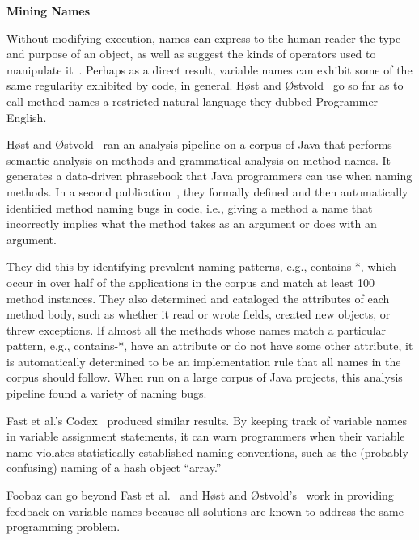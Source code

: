 {\bf Mining Names}

Without modifying execution, names can express to the human reader the type and purpose of an object, as well as suggest the kinds of operators used to manipulate it~\cite{jones2008operand}. Perhaps as a direct result, variable names can exhibit some of the same regularity exhibited by code, in general. H{{\o{}}}st and {{\O{}}}stvold~\cite{host2008java} go so far as to call method names a restricted natural language they dubbed Programmer English.

H{{\o{}}}st and {{\O{}}}stvold~\cite{host2008java} ran an analysis pipeline on a corpus of Java that performs semantic analysis on methods and grammatical analysis on method names. It generates a data-driven phrasebook that Java programmers can use when naming methods. In a second publication~\cite{host2009debugging}, they formally defined and then automatically identified method naming bugs in code, i.e., giving a method a name that incorrectly implies what the method takes as an argument or does with an argument.

They did this by identifying prevalent naming patterns, e.g., contains-*, which occur in over half of the applications in the corpus and match at least 100 method instances. They also determined and cataloged the attributes of each method body, such as whether it read or wrote fields, created new objects, or threw exceptions. If almost all the methods whose names match a particular pattern, e.g., contains-*, have an attribute or do not have some other attribute, it is automatically determined to be an implementation rule that all names in the corpus should follow. When run on a large corpus of Java projects, this analysis pipeline found a variety of naming bugs.

Fast et al.'s Codex~\cite{codex} produced similar results. By keeping track of variable names in variable assignment statements, it can warn programmers when their variable name violates statistically established naming conventions, such as the (probably confusing) naming of a hash object ``array.'' 

Foobaz can go beyond Fast et al.~\cite{codex} and H{{\o{}}}st and {{\O{}}}stvold's~\cite{host2008java,host2009debugging} work in providing feedback on variable names because all solutions are known to address the same programming problem.

